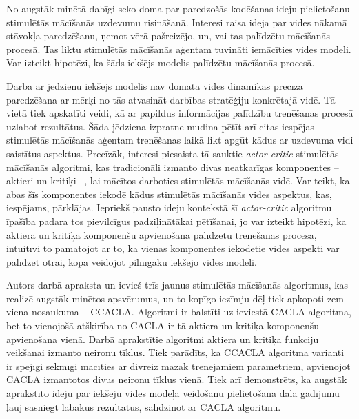 \documentclass{ludis} %
\begin{document}
No augstāk minētā dabīgi seko doma par paredzošās kodēšanas ideju pielietošanu
stimulētās mācīšanās uzdevumu risināšanā. Interesi raisa ideja par vides nākamā
stāvokļa paredzēšanu, ņemot vērā pašreizējo, un, vai tas palīdzētu mācīšanās
procesā. Tas liktu stimulētās mācīšanās aģentam tuvināti iemācīties vides
modeli. Var izteikt hipotēzi, ka šāds iekšējs modelis palīdzētu
mācīšanās procesā.

Darbā ar jēdzienu iekšējs modelis nav domāta vides dinamikas precīza
paredzēšana ar mērķi no tās atvasināt darbības stratēģiju konkrētajā vidē. Tā
vietā tiek apskatīti veidi, kā ar papildus informācijas palīdzību trenēšanas
procesā uzlabot rezultātus. Šāda jēdziena izpratne mudina pētīt arī citas
iespējas stimulētās mācīšanās aģentam trenēšanas laikā likt apgūt kādus ar
uzdevuma vidi saistītus aspektus. Precīzāk, interesi piesaista tā sauktie
\textit{actor-critic} stimulētās mācīšanās algoritmi, kas tradicionāli izmanto
divas neatkarīgas komponentes -- aktieri un kritiķi --, lai mācītos darboties
stimulētās mācīšanās vidē. Var teikt, ka abas šīs komponentes iekodē kādus
stimulētās mācīšanās vides aspektus, kas, iespējams, pārklājas. Iepriekš pausto
ideju kontekstā šī \textit{actor-critic} algoritmu īpašība padara tos
pievilcīgus padziļinātākai pētīšanai, jo var izteikt hipotēzi, ka aktiera un
kritiķa komponenšu apvienošana palīdzētu trenēšanas procesā, intuitīvi to
pamatojot ar to, ka vienas komponentes iekodētie vides aspekti var palīdzēt
otrai, kopā veidojot pilnīgāku iekšējo vides modeli.


Autors darbā apraksta un ievieš trīs jaunus stimulētās mācīšanās algoritmus, kas
realizē augstāk minētos apsvērumus, un to kopīgo iezīmju dēļ tiek apkopoti zem
viena nosaukuma -- CCACLA. Algoritmi ir balstīti uz \autocite{Hasselt2009}
ieviestā CACLA algoritma, bet to vienojošā atšķirība no CACLA ir tā aktiera un
kritiķa komponenšu apvienošana vienā. Darbā aprakstītie algoritmi aktiera un
kritiķa funkciju veikšanai izmanto neironu tīklus. Tiek parādīts, ka CCACLA
algoritma varianti ir spējīgi sekmīgi mācīties ar divreiz mazāk trenējamiem
parametriem, apvienojot CACLA izmantotos divus neironu tīklus vienā. Tiek arī
demonstrēts, ka augstāk aprakstīto ideju par iekšēju vides modeļa veidošanu
pielietošana daļā gadījumu ļauj sasniegt labākus rezultātus, salīdzinot ar CACLA
algoritmu.
\end{document}
